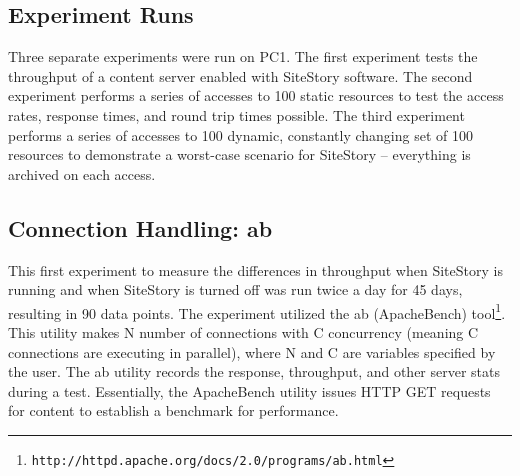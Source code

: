 \documentclass[runningheads,a4paper]{llncs}
\begin{document}


\subsection{Experiment Runs}
\label{runs}
\vskip -3mm
Three separate experiments were run on PC1. The first experiment tests the throughput of a content server enabled with SiteStory software. The second experiment performs a series of accesses to 100 static resources to test the access rates, response times, and round trip times possible. The third experiment performs a series of accesses to 100 dynamic, constantly changing set of 100 resources to demonstrate a worst-case scenario for SiteStory -- everything is archived on each access. 

\subsection{Connection Handling: ab}
\label{ab}
\vskip -3mm
This first experiment to measure the differences in throughput when SiteStory is running and when SiteStory is turned off was run twice a day 
for 45 days, resulting in 90 data points. The experiment utilized the ab (ApacheBench) tool\footnote{\texttt{http://httpd.apache.org/docs/2.0/programs/ab.html}}. This utility makes N number of connections with C concurrency (meaning C connections are executing in parallel), where N and C are variables specified by the user. The ab utility records the response, throughput, and other server stats during a test. Essentially, the ApacheBench utility issues HTTP GET requests for content to establish a benchmark for performance. 
\end{document}
